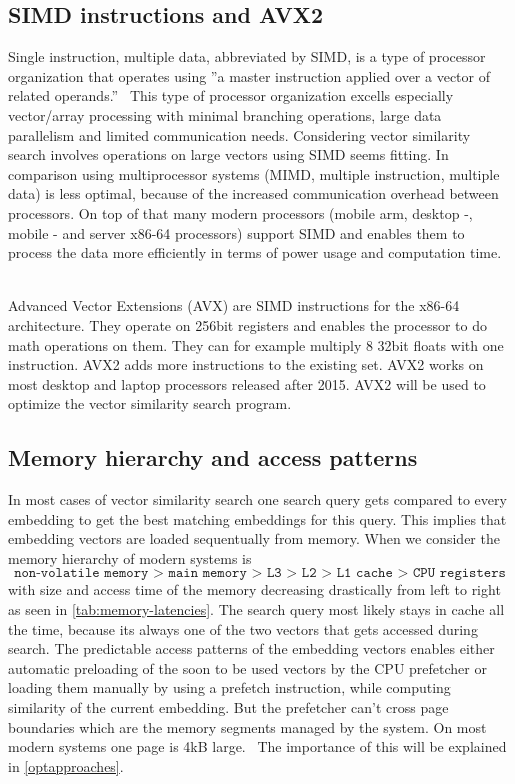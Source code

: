 \subsection{SIMD instructions and AVX2}
Single instruction, multiple data, abbreviated by SIMD, is a type of processor organization that operates using ''a master instruction applied over a vector of related operands.''~\cite{simd_flynn}
This type of processor organization excells especially vector/array processing with minimal branching operations, large data parallelism and limited communication needs. Considering vector similarity search involves operations on large vectors using SIMD seems fitting. In comparison using multiprocessor systems (MIMD, multiple instruction, multiple data) is less optimal, because of the increased communication overhead between processors. On top of that many modern processors (mobile arm, desktop -, mobile - and server x86-64 processors) support SIMD and enables them to process the data more efficiently in terms of power usage and computation time.
~\cite{comparingsimdonx8664andarm64,simdtoaccelerateperformance,khadem2023vectorprocessingmobiledevicesbenchmark}

Advanced Vector Extensions (AVX) are SIMD instructions for the x86-64 architecture. They operate on 256bit registers and enables the processor to do math operations on them. They can for example multiply 8 32bit floats with one instruction. AVX2 adds more instructions to the existing set. AVX2 works on most desktop and laptop processors released after 2015. AVX2 will be used to optimize the vector similarity search program.

\subsection{Memory hierarchy and access patterns}
In most cases of vector similarity search one search query gets compared to every embedding to get the best matching embeddings for this query. This implies that embedding vectors are loaded sequentually from memory.
When we consider the memory hierarchy of modern systems is
\[\texttt{non-volatile memory > main memory > L3 > L2 > L1 cache > CPU registers}\]
with size and access time of the memory decreasing drastically from left to right as seen in \autoref{tab:memory-latencies}. The search query most likely stays in cache all the time, because its always one of  the two vectors that gets accessed during search.
The predictable access patterns of the embedding vectors enables either automatic preloading of the soon to be used vectors by the CPU prefetcher or loading them manually by using a prefetch instruction, while computing similarity of the current embedding. But the prefetcher can't cross page boundaries which are the memory segments managed by the system. On most modern systems one page is 4kB large.~\cite{Drepper2007WhatEP} The importance of this will be explained in \autoref{optapproaches}.

